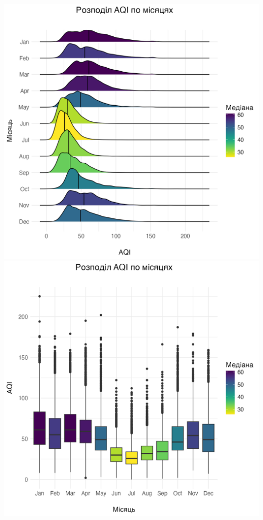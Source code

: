 \documentclass{article}
\begin{document}
\begin{enumerate}
    \begin{center}
    \includegraphics[width=6in]{question4/seasonal_change_ridgeline.png}
    \includegraphics[width=6in]{question4/seasonal_change.png}
    \end{center} 


\end{enumerate}
\end{document}
